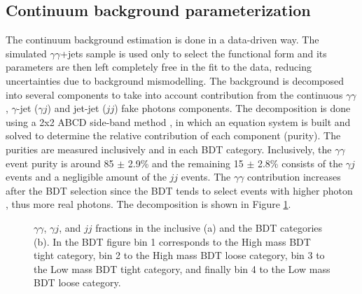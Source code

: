 \subsection{Continuum background parameterization}
\label{HHyybb:Modelling:Bkg}

The continuum background estimation is done in a data-driven way. The simulated $\gamma\gamma$+jets sample is used only to select the functional form and its parameters are then left completely free in the fit to the data, reducing uncertainties due to background mismodelling. The background is decomposed into several components to take into account contribution from the continuous $\gamma\gamma$, $\gamma$-jet ($\gamma j$) and jet-jet ($jj$) fake photons components. The decomposition is done using a 2x2 ABCD side-band method \cite{ABCD}, in which an equation system is built and solved to determine the relative contribution of each component (purity). The purities are measured inclusively and in each BDT category. Inclusively, the $\gamma\gamma$ event purity is around 85 $\pm$ 2.9\% and the remaining 15 $\pm$ 2.8\% consists of the $\gamma j$ events and a negligible amount of the $jj$ events. The $\gamma\gamma$ contribution increases after the BDT selection since the BDT tends to select events with higher photon \pT, thus more real photons. The decomposition is shown in Figure \ref{fig:HHyybb:Modelling:Bkg:Decom}. 
\begin{figure}[htbp]
    \centering
    \caption{$\gamma\gamma$, $\gamma j$, and $jj$ fractions in the inclusive (a) and the BDT categories (b). In the BDT figure bin 1 corresponds to the High mass BDT tight category, bin 2 to the High mass BDT loose category, bin 3 to the Low mass BDT tight category, and finally bin 4 to the Low mass BDT loose category.}
    \label{fig:HHyybb:Modelling:Bkg:Decom}
\end{figure}
